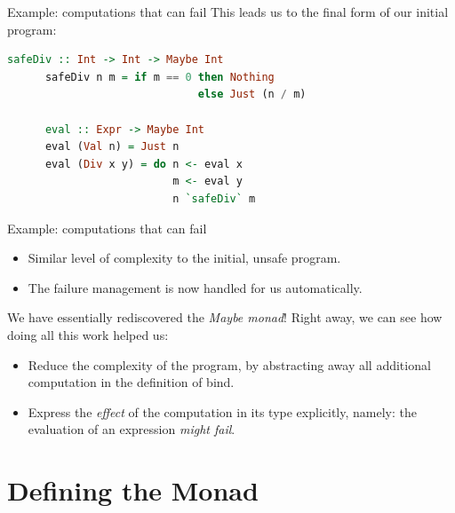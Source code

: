 \documentclass{beamer}
\begin{document}
\begin{frame}[fragile]{Example: computations that can fail}
    This leads us to the final form of our initial program:

    \begin{minipage}{\linewidth} \hspace{1cm}
    \begin{lstlisting}[language=haskell, numbers=none, frame=none]
      safeDiv :: Int -> Int -> Maybe Int
      safeDiv n m = if m == 0 then Nothing
                              else Just (n / m)

      eval :: Expr -> Maybe Int
      eval (Val n) = Just n
      eval (Div x y) = do n <- eval x
                          m <- eval y
                          n `safeDiv` m
    \end{lstlisting}
    \end{minipage} \hspace{1cm}
\end{frame}

\begin{frame}[fragile]{Example: computations that can fail}
    \begin{itemize}
        \item Similar level of complexity to the initial, unsafe program.
        \item The failure management is now handled for us automatically.
    \end{itemize}

    \bigbreak
    We have essentially rediscovered the \textit{Maybe monad}!
    Right away, we can see how doing all this work helped us:

    \bigbreak
    \begin{itemize}
        \setlength \itemsep{1em}
        \item Reduce the complexity of the program, by abstracting away
              all additional computation in the definition of bind.
        \item Express the \textit{effect} of the computation in its type
              explicitly, namely: the evaluation of an expression
              \textit{might fail}.
    \end{itemize}
\end{frame}

\section{Defining the Monad}
\end{document}
